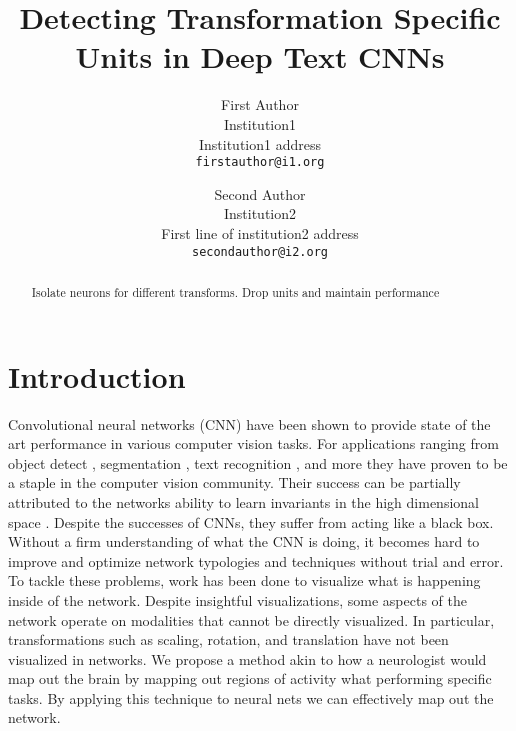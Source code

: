 \documentclass[10pt,twocolumn,letterpaper]{article}
\begin{document}
\title{Detecting Transformation Specific Units in Deep Text CNNs}

\author{First Author\\
Institution1\\
Institution1 address\\
{\tt\small firstauthor@i1.org}
\and
Second Author\\
Institution2\\
First line of institution2 address\\
{\tt\small secondauthor@i2.org}
}

\maketitle

\begin{abstract}
   Isolate neurons for different transforms.
   Drop units and maintain performance
\end{abstract}

\section{Introduction}
Convolutional neural networks (CNN) have been shown to provide state of the art performance in various computer vision tasks.  For applications ranging from object detect \cite{}, segmentation \cite{}, text recognition \cite{}, and more they have proven to be a staple in the computer vision community. Their success can be partially attributed to the networks ability to learn invariants in the high dimensional space \cite{}. Despite the successes of CNNs, they suffer from acting like a black box. Without a firm understanding of what the CNN is doing, it becomes hard to improve and optimize network typologies and techniques without trial and error. To tackle these problems, work has been done to visualize what is happening inside of the network. Despite insightful visualizations, some aspects of the network operate on modalities that cannot be directly visualized. In particular, transformations such as scaling, rotation, and translation have not been visualized in networks. We propose a method akin to how a neurologist would map out the brain by mapping out regions of activity what performing specific tasks.\cite{} By applying this technique to neural nets we can effectively map out the network.
\end{document}
